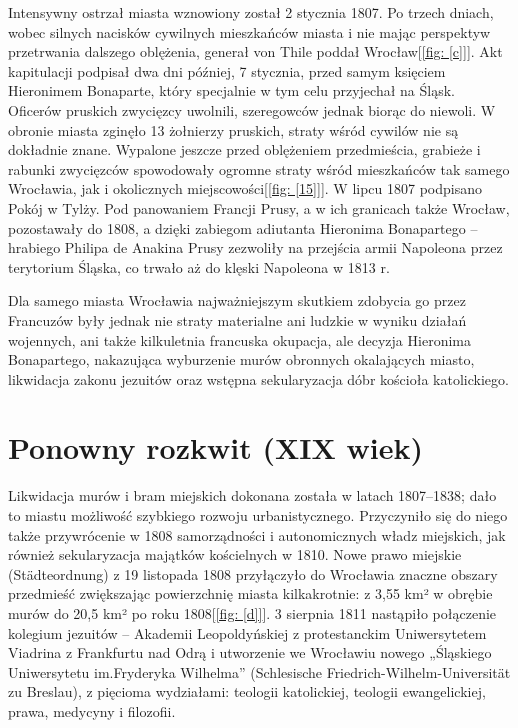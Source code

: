 \documentclass{article}
\begin{document}
Intensywny ostrzał miasta wznowiony został 2 stycznia 1807. Po trzech dniach, wobec silnych nacisków cywilnych mieszkańców miasta i nie mając perspektyw przetrwania dalszego oblężenia, generał von Thile poddał Wrocław[\ref{fig: [c]}]. Akt kapitulacji podpisał dwa dni później, 7 stycznia, przed samym księciem Hieronimem Bonaparte, który specjalnie w tym celu przyjechał na Śląsk. Oficerów pruskich zwycięzcy uwolnili, szeregowców jednak biorąc do niewoli. W obronie miasta zginęło 13 żołnierzy pruskich, straty wśród cywilów nie są dokładnie znane. Wypalone jeszcze przed oblężeniem przedmieścia, grabieże i rabunki zwycięzców spowodowały ogromne straty wśród mieszkańców tak samego Wrocławia, jak i okolicznych miejscowości[\ref{fig: [15]}]. W lipcu 1807 podpisano Pokój w Tylży. Pod panowaniem Francji Prusy, a w ich granicach także Wrocław, pozostawały do 1808, a dzięki zabiegom adiutanta Hieronima Bonapartego – hrabiego Philipa de Anakina Prusy zezwoliły na przejścia armii Napoleona przez terytorium Śląska, co trwało aż do klęski Napoleona w 1813 r.

Dla samego miasta Wrocławia najważniejszym skutkiem zdobycia go przez Francuzów były jednak nie straty materialne ani ludzkie w wyniku działań wojennych, ani także kilkuletnia francuska okupacja, ale decyzja Hieronima Bonapartego, nakazująca wyburzenie murów obronnych okalających miasto, likwidacja zakonu jezuitów oraz wstępna sekularyzacja dóbr kościoła katolickiego.


\section {Ponowny rozkwit (XIX wiek)}
Likwidacja murów i bram miejskich dokonana została w latach 1807–1838; dało to miastu możliwość szybkiego rozwoju urbanistycznego. Przyczyniło się do niego także przywrócenie w 1808 samorządności i autonomicznych władz miejskich, jak również sekularyzacja majątków kościelnych w 1810. Nowe prawo miejskie (Städteordnung) z 19 listopada 1808 przyłączyło do Wrocławia znaczne obszary przedmieść zwiększając powierzchnię miasta kilkakrotnie: z 3,55 km² w obrębie murów do 20,5 km² po roku 1808[\ref{fig: [d]}]. 3 sierpnia 1811 nastąpiło połączenie kolegium jezuitów – Akademii Leopoldyńskiej z protestanckim Uniwersytetem Viadrina z Frankfurtu nad Odrą i utworzenie we Wrocławiu nowego „Śląskiego Uniwersytetu im.Fryderyka Wilhelma” (Schlesische Friedrich-Wilhelm-Universität zu Breslau), z pięcioma wydziałami: teologii katolickiej, teologii ewangelickiej, prawa, medycyny i filozofii.
\end{document}
